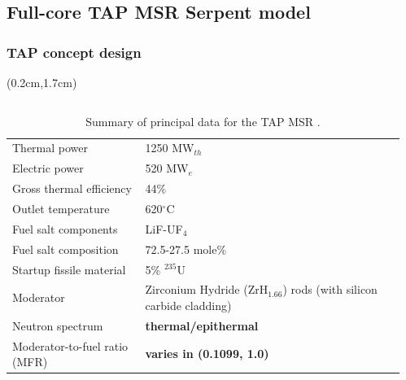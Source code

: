 \subsection{Full-core TAP MSR Serpent model}


\begin{frame}
\frametitle{TAP concept design}

\begin{textblock*}{12.5cm}(0.2cm,1.7cm) %
	
	\begin{columns}
		\column[t]{6cm}
			\vspace{+5mm}
	\begin{table}[h!]
		\fontsize{7}{10}\selectfont
	\caption{Summary of principal data for the \gls{TAP} \gls{MSR} 
		\cite{transatomic_power_corporation_technical_2016, 
			betzler_assessment_2017}. }
		\vspace{-2mm}
	\begin{tabularx}{\textwidth}{ X  X }
		\hline
		Thermal power				           		& 1250 MW$_{th}  $       
		\\ 
		Electric power		                		& 520 MW$_e  $ 			 
		\\ 
		Gross thermal efficiency        			& 44\%     				 
		\\  
		Outlet temperature							& 620$^{\circ}$C         
		\\ 
		Fuel salt components                   & LiF-UF$_4$				 \\  
		Fuel salt composition                  & 72.5-27.5 mole\%			 
		\\  
		Startup fissile material                     & 5\% 
		$^{235}$U          	 \\
		Moderator                              & Zirconium Hydride 
		(ZrH$_{1.66}$) rods (with silicon carbide cladding) \\
		Neutron spectrum						& 
		\textbf{thermal/epithermal}                 \\
		Moderator-to-fuel ratio	(MFR)					& 
		\textbf{varies in (0.1099, 1.0)}                 \\
		\hline
	\end{tabularx}
	\label{tab:tap_tab}
	\end{table}
		

\end{columns}
\end{textblock*}
\end{frame}
